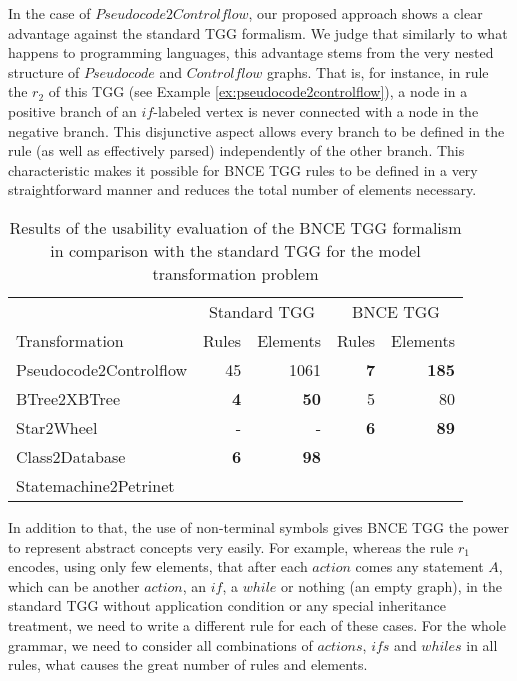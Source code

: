 \documentclass[a4paper,twoside]{article}
\begin{document}
In the case of $Pseudocode2Controlflow$, our proposed approach shows a clear advantage against the standard TGG formalism. We judge that similarly to what happens to programming languages, this advantage stems from the very nested structure of $Pseudocode$ and $Controlflow$ graphs. That is, for instance, in rule the $r_2$ of this TGG (see Example \ref{ex:pseudocode2controlflow}), a node in a positive branch of an $if$-labeled vertex is never connected with a node in the negative branch. This disjunctive aspect allows every branch to be defined in the rule (as well as effectively parsed) independently of the other branch. This characteristic makes it possible for BNCE TGG rules to be defined in a very straightforward manner and reduces the total number of elements necessary.

\begin{table*}
	\setlength{\tabcolsep}{10pt}
	\centering
	\begin{tabular}{l r r r r }
		\hline
		& \multicolumn{2}{c}{Standard TGG} & \multicolumn{2}{c}{BNCE TGG}\\
		Transformation 			& Rules & Elements 	& Rules & Elements\\
		\hline
		Pseudocode2Controlflow	& 45			& 1061	& \textbf{7}	& \textbf{185} \\
		BTree2XBTree			& \textbf{4}	& \textbf{50}	& 5		& 80 \\
		Star2Wheel				& -				& -		& \textbf{6} 	& \textbf{89} \\
		Class2Database			& \textbf{6}	& \textbf{98}	& 	&  \\
		Statemachine2Petrinet	& 	& 	& 	&  \\
		\hline
	\end{tabular}
	\caption{Results of the usability evaluation of the BNCE TGG formalism in comparison with the standard TGG for the model transformation problem}
	\label{tab:formalism-eval}
\end{table*}

In addition to that, the use of non-terminal symbols gives BNCE TGG the power to represent abstract concepts very easily. For example, whereas the rule $r_1$ encodes, using only few elements, that after each $action$ comes any statement $A$, which can be another $action$, an $if$, a $while$ or nothing (an empty graph), in the standard TGG without application condition or any special inheritance treatment, we need to write a different rule for each of these cases. For the whole grammar, we need to consider all combinations of $actions$, $ifs$ and $whiles$ in all rules, what causes the great number of rules and elements.
\end{document}
